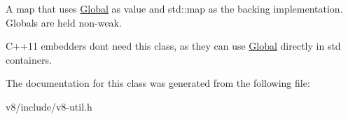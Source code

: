A map that uses \mbox{\hyperlink{classv8_1_1Global}{Global}} as value and std\+::map as the backing implementation. Globals are held non-\/weak.

C++11 embedders don\textquotesingle{}t need this class, as they can use \mbox{\hyperlink{classv8_1_1Global}{Global}} directly in std containers. 

The documentation for this class was generated from the following file\+:\begin{DoxyCompactItemize}
\item 
v8/include/v8-\/util.\+h\end{DoxyCompactItemize}
